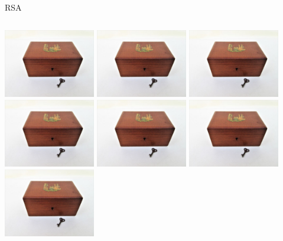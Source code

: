 \documentclass{beamer}
\begin{document}
\begin{frame}{RSA}
\begin{columns}
		\begin{column}[T]{0.5\textwidth}
			\includegraphics[width=0.3\textwidth]{img/box.jpg}
			\includegraphics[width=0.3\textwidth]{img/box.jpg}
			\includegraphics[width=0.3\textwidth]{img/box.jpg} \\
						\includegraphics[width=0.3\textwidth]{img/box.jpg}
			\includegraphics[width=0.3\textwidth]{img/box.jpg}
			\includegraphics[width=0.3\textwidth]{img/box.jpg} \\
						\includegraphics[width=0.3\textwidth]{img/box.jpg}

\end{column}
\end{columns}
\end{frame}
\end{document}
